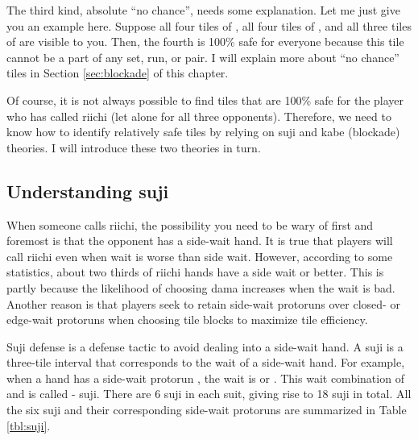 \bigskip
The third kind, absolute ``no chance'', needs some explanation. Let me just give you an example here. Suppose all four tiles of {\large {}}, all four tiles of {\large {}}, and all three tiles of {\large {}} are visible to you. Then, the fourth {\large {}} is 100\% safe for everyone because this tile cannot be a part of any set, run, or pair. I will explain more about ``no chance'' tiles in Section \ref{sec:blockade} of this chapter.

\bigskip
Of course, it is not always possible to find tiles that are 100\% safe for the player who has called {\jap riichi} (let alone for all three opponents). Therefore, we need to know how to identify relatively safe tiles by relying on {\jap suji} and {\jap kabe} (blockade) theories. I will introduce these two theories in turn.

\subsection{Understanding {\jap suji}}  \label{sec:suji}

When someone calls {\jap riichi}, the possibility you need to be wary of first and foremost is that the opponent has a side-wait hand. It is true that players will call {\jap riichi} even when wait is worse than side wait. However, according to some statistics, about two thirds of {\jap riichi} hands have a side wait or better. This is partly because the likelihood of choosing {\jap dama} increases when the wait is bad. Another reason is that players seek to retain side-wait protoruns over closed- or edge-wait protoruns when choosing tile blocks to maximize tile efficiency.

\bigskip
{\jap Suji} defense is a defense tactic to avoid dealing into a side-wait hand. A {\jap suji} is a three-tile interval that corresponds to the wait of a side-wait hand. For example, when a hand has a side-wait protorun {\large {}}, the wait is {\large {}} or {\large {}}. This wait combination of {\large{}} and {\large{}} is called {\large{}-} {\jap suji}. There are 6 {\jap suji} in each suit, giving rise to 18 {\jap suji} in total. All the six {\jap suji} and their corresponding side-wait protoruns are summarized in Table \ref{tbl:suji}. 

